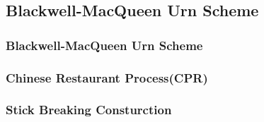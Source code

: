 \documentclass{beamer}
\begin{document}
\subsection{Blackwell-MacQueen Urn Scheme}
\begin{frame}
\frametitle{Blackwell-MacQueen Urn Scheme}
\end{frame}


\begin{frame}
\frametitle{Chinese Restaurant Process(CPR)}
\end{frame}


\begin{frame}
\frametitle{Stick Breaking Consturction}
\end{frame}
\end{document}
